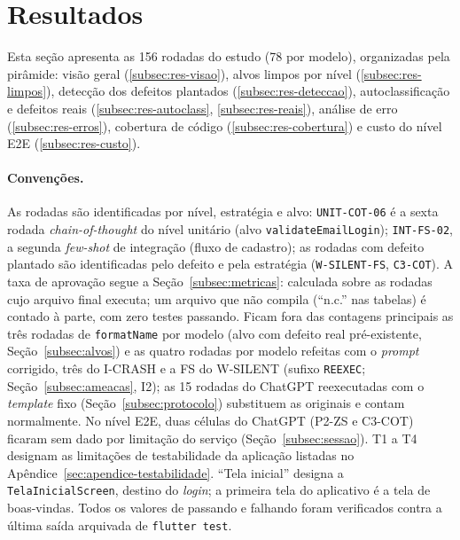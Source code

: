 \documentclass[12pt]{article}
\begin{document}
\section{Resultados}
\label{sec:resultados}

Esta seção apresenta as 156 rodadas do estudo (78 por modelo), organizadas
pela pirâmide: visão geral (\ref{subsec:res-visao}), alvos limpos por nível
(\ref{subsec:res-limpos}), detecção dos defeitos plantados
(\ref{subsec:res-deteccao}), autoclassificação e defeitos reais
(\ref{subsec:res-autoclass}, \ref{subsec:res-reais}), análise de erro
(\ref{subsec:res-erros}), cobertura de código (\ref{subsec:res-cobertura}) e
custo do nível E2E (\ref{subsec:res-custo}).

\paragraph{Convenções.} As rodadas são identificadas por nível, estratégia
e alvo: \texttt{UNIT-COT-06} é a sexta rodada \textit{chain-of-thought} do
nível unitário (alvo \texttt{validateEmailLogin}); \texttt{INT-FS-02}, a
segunda \textit{few-shot} de integração (fluxo de cadastro); as rodadas com
defeito plantado são identificadas pelo defeito e pela estratégia
(\texttt{W-SILENT-FS}, \texttt{C3-COT}). A taxa de aprovação segue a
Seção~\ref{subsec:metricas}: calculada sobre as rodadas cujo arquivo final
executa; um arquivo que não compila (``n.c.'' nas tabelas) é contado à parte,
com zero testes passando. Ficam fora das contagens principais as três rodadas
de \texttt{formatName} por modelo (alvo com defeito real pré-existente,
Seção~\ref{subsec:alvos}) e as quatro rodadas por modelo refeitas com o
\textit{prompt} corrigido, três do I-CRASH e a FS do W-SILENT (sufixo \texttt{REEXEC};
Seção~\ref{subsec:ameacas}, I2); as 15 rodadas do ChatGPT reexecutadas com o
\textit{template} fixo (Seção~\ref{subsec:protocolo}) substituem as originais
e contam normalmente. No nível E2E, duas células do ChatGPT (P2-ZS e C3-COT)
ficaram sem dado por limitação do serviço (Seção~\ref{subsec:sessao}). T1 a
T4 designam as limitações de testabilidade da aplicação listadas no
Apêndice~\ref{sec:apendice-testabilidade}. ``Tela inicial'' designa a
\texttt{TelaInicialScreen}, destino do \textit{login}; a primeira tela do
aplicativo é a tela de boas-vindas. Todos os valores de passando e falhando
foram verificados contra a última saída arquivada de \texttt{flutter test}.
\end{document}
